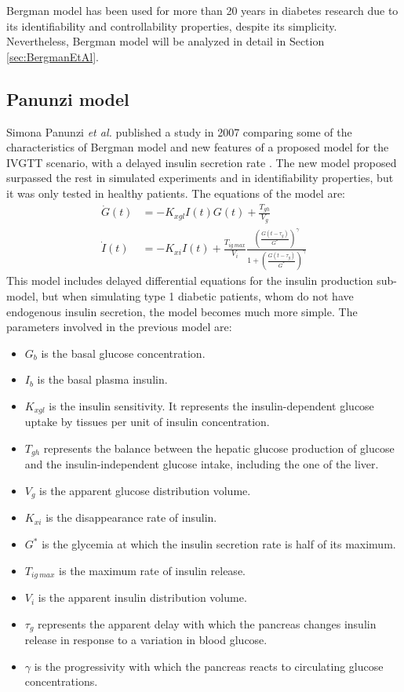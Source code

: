 Bergman model has been used for more than 20 years in diabetes research due to its identifiability and controllability properties, despite its simplicity. Nevertheless, Bergman model will be analyzed in detail in Section \ref{sec:BergmanEtAl}.

\subsection{Panunzi model}
\label{sec:PanunziEtAl}

Simona Panunzi \textit{et al.} published a study in 2007 comparing some of the characteristics of Bergman model and new features of a proposed model for the IVGTT scenario, with a delayed insulin secretion rate \cite{panunzi2007discrete}. The new model proposed surpassed the rest in simulated experiments and in identifiability properties, but it was only tested in healthy patients. The equations of the model are:
\begin{align}
  \dot{G}(t) &= -K_{xgl}I(t)G(t) +\frac{T_{gh}}{V_{g}} \label{eq:Panunzi1} \\
  \dot{I}(t) &= -K_{xi}I(t)+\frac{T_{ig\ max}}{V_{i}}\frac{\left(\frac{G(t-\tau_{g})}{G^{*}}\right)^{\gamma}}{1+\left(\frac{G(t-\tau_{g})}{G^{*}}\right)^{\gamma}} \label{eq:Panunzi2}
\end{align}
This model includes delayed differential equations for the insulin production sub-model, but when simulating type 1 diabetic patients, whom do not have endogenous insulin secretion, the model becomes much more simple. The parameters involved in the previous model are:
\begin{itemize}
	\item \textbf{$G_{b}$} is the basal glucose concentration.
	\item \textbf{$I_{b}$} is the basal plasma insulin.
	\item \textbf{$K_{xgl}$} is the insulin sensitivity. It represents the insulin-dependent glucose uptake by tissues per unit of insulin concentration.
	\item \textbf{$T_{gh}$} represents the balance between the hepatic glucose production of glucose and the insulin-independent glucose intake, including the one of the liver.
	\item \textbf{$V_{g}$} is the apparent glucose distribution volume.
	\item \textbf{$K_{xi}$} is the disappearance rate of insulin.
	\item \textbf{$G^{*}$} is the glycemia at which the insulin secretion rate is half of its maximum.
	\item \textbf{$T_{ig\ max}$} is the maximum rate of insulin release.
	\item \textbf{$V_{i}$} is the apparent insulin distribution volume.
	\item \textbf{$\tau_{g}$} represents the apparent delay with which the pancreas changes insulin release in response to a variation in blood glucose.
	\item \textbf{$\gamma$} is the progressivity with which the pancreas reacts to circulating glucose concentrations.
\end{itemize}
